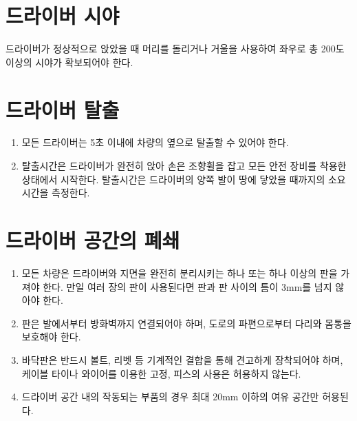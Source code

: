 \documentclass[final,a4paper,10pt]{report}
\begin{document}
\section{드라이버 시야} \label{section:드라이버 시야}
드라이버가 정상적으로 앉았을 때 머리를 돌리거나 거울을 사용하여 좌우로 총 200도 이상의 시야가 확보되어야 한다.

\section{드라이버 탈출} \label{section:드라이버 탈출}
\begin{enumerate}
  \item 모든 드라이버는 5초 이내에 차량의 옆으로 탈출할 수 있어야 한다.
  \item 탈출시간은 드라이버가 완전히 앉아 손은 조향휠을 잡고 모든 안전 장비를 착용한 상태에서 시작한다. 탈출시간은 드라이버의 양쪽 발이 땅에 닿았을 때까지의 소요시간을 측정한다.
\end{enumerate}

\section{드라이버 공간의 폐쇄} \label{section:드라이버 공간 폐쇄}
\begin{enumerate}
  \item 모든 차량은 드라이버와 지면을 완전히 분리시키는 하나 또는 하나 이상의 판을 가져야 한다. 만일 여러 장의 판이 사용된다면 판과 판 사이의 틈이 3mm를 넘지 않아야 한다.
  \item 판은 발에서부터 방화벽까지 연결되어야 하며, 도로의 파편으로부터 다리와 몸통을 보호해야 한다.
  \item 바닥판은 반드시 볼트, 리벳 등 기계적인 결합을 통해 견고하게 장착되어야 하며, 케이블 타이나 와이어를 이용한 고정, 피스의 사용은 허용하지 않는다.
  \item 드라이버 공간 내의 작동되는 부품의 경우 최대 20mm 이하의 여유 공간만 허용된다.
\end{enumerate}
\end{document}
